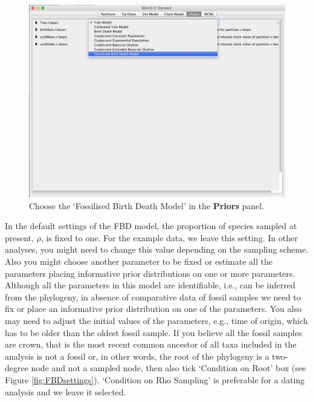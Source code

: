 \documentclass[12pt]{article}
\begin{document}
\begin{figure}	
\centering
\includegraphics[width=\textwidth]{figures/FBDmodel}
\caption{Choose the `Fossilised Birth Death Model' in the {\bf Priors} panel. \label{fig:FBDmodel}}
\label{fig:BEAUti_ImportNexus}
\end{figure}

In the default settings of the FBD model, the proportion of species sampled at present, $\rho$, is fixed to one. For the example data, we leave this setting. In other analyses, you might need to change this value depending on the sampling scheme. Also you might choose another parameter to be fixed or estimate all the parameters placing informative prior distributions on one or more parameters. Although all the parameters in this model are identifiable, i.e., can be inferred from the phylogeny, in absence of comparative data of fossil samples we need to fix or place an informative prior distribution on one of the parameters.  You also may need to adjust the initial values of the parameters, e.g.,  time of origin, which has to be older than the oldest fossil sample. If you believe all the fossil samples are crown, that is the most recent common ancestor of all taxa included in the analysis is not a fossil or, in other words, the root of the phylogeny is a two-degree node and not a sampled node, then also tick `Condition on Root' box (see Figure \ref{fig:FBDsettings}). `Condition on Rho Sampling' is preferable for a dating analysis and we leave it selected. 
\end{document}
